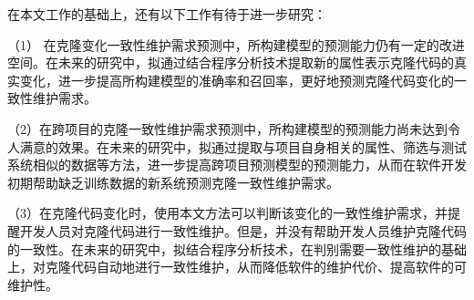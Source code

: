 在本文工作的基础上，还有以下工作有待于进一步研究：

（1） 在克隆变化一致性维护需求预测中，所构建模型的预测能力仍有一定的改进空间。在未来的研究中，拟通过结合程序分析技术提取新的属性表示克隆代码的真实变化，进一步提高所构建模型的准确率和召回率，更好地预测克隆代码变化的一致性维护需求。

（2）在跨项目的克隆一致性维护需求预测中，所构建模型的预测能力尚未达到令人满意的效果。在未来的研究中，拟通过提取与项目自身相关的属性、筛选与测试系统相似的数据等方法，进一步提高跨项目预测模型的预测能力，从而在软件开发初期帮助缺乏训练数据的新系统预测克隆一致性维护需求。

（3）在克隆代码变化时，使用本文方法可以判断该变化的一致性维护需求，并提醒开发人员对克隆代码进行一致性维护。但是，并没有帮助开发人员维护克隆代码的一致性。在未来的研究中，拟结合程序分析技术，在判别需要一致性维护的基础上，对克隆代码自动地进行一致性维护，从而降低软件的维护代价、提高软件的可维护性。%